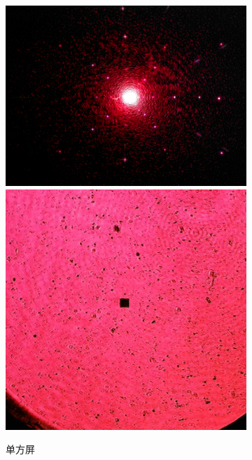 \documentclass[a4paper]{article}
\begin{document}
\begin{figure}[htbp]
    \begin{subfigure}[htbp]{0.3\textwidth}
        \centering
        \includegraphics[width=\textwidth]{fre-done/2-1.JPG}
        \includegraphics[width=\textwidth]{img-done/2-1.JPG}
        \caption{单方屏}
        \label{2-1}
    \end{subfigure}
    \begin{subfigure}[htbp]{0.3\textwidth}

\end{subfigure}
\end{figure}
\end{document}

